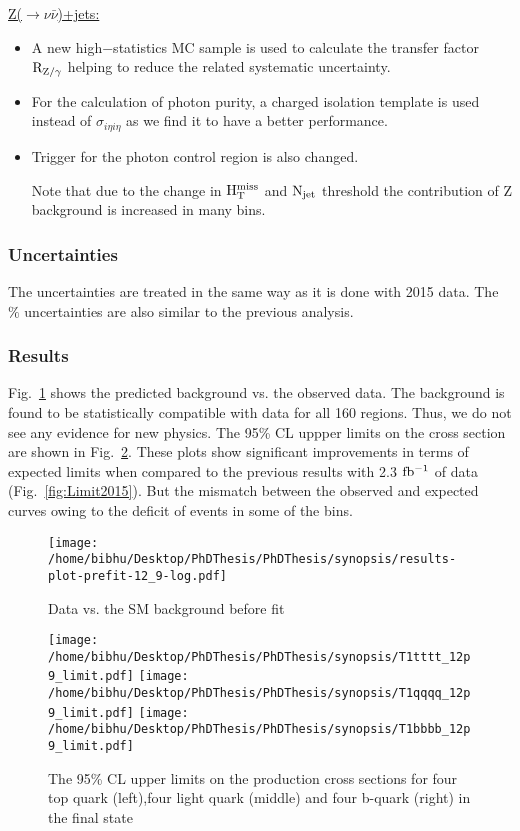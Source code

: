 \underline{Z($\rightarrow \nu \bar{\nu}$)+jets: } 

\begin{itemize}

\item A new high$-$statistics MC sample is used to calculate the transfer factor $\rm R_{Z/\gamma}$ helping to  reduce the related systematic uncertainty.

\item For the calculation of photon purity, a charged isolation template is used instead of $\sigma_{i\eta i\eta}$ as we find it to have a better performance.

\item Trigger for the photon control region is also changed. 

Note that due to the change in $\rm H_{T}^{miss}$ and $\rm N_{jet}$ threshold the contribution of Z background is increased in many bins.

\end{itemize}

\subsubsection{Uncertainties}

The uncertainties are treated in the same way as it is done with 2015 data. The $\%$ uncertainties are also similar to the previous analysis.




\subsubsection{Results}
Fig.~\ref{fig:Datavsbkg2016} shows the predicted background vs. the observed data. The background is found to be statistically compatible with data for all 160 regions. Thus, we do not see any evidence for new physics. The  95\% CL uppper limits on the cross section are shown in Fig.~\ref{fig:Limit2016Synop}. These plots show significant improvements in terms of expected limits when compared to the previous results with 2.3 $\rm fb^{-1}$ of data (Fig.~\ref{fig:Limit2015}). But the mismatch between the observed and expected curves owing to the deficit of events in some of the bins.   
\begin{figure}
\centering
\texttt{[image: /home/bibhu/Desktop/PhDThesis/PhDThesis/synopsis/results-plot-prefit-12\_9-log.pdf]}
\caption{\label{fig:Datavsbkg2016} Data vs. the SM background before fit}
\end{figure}
\begin{figure}[h]
\centering
\texttt{[image: /home/bibhu/Desktop/PhDThesis/PhDThesis/synopsis/T1tttt\_12p9\_limit.pdf]}
\texttt{[image: /home/bibhu/Desktop/PhDThesis/PhDThesis/synopsis/T1qqqq\_12p9\_limit.pdf]}
\texttt{[image: /home/bibhu/Desktop/PhDThesis/PhDThesis/synopsis/T1bbbb\_12p9\_limit.pdf]}
\caption{\label{fig:Limit2016Synop}The 95\% CL upper limits on the production cross sections for four top quark (left),four light quark (middle) and four b-quark (right) in the final state}
\end{figure}





